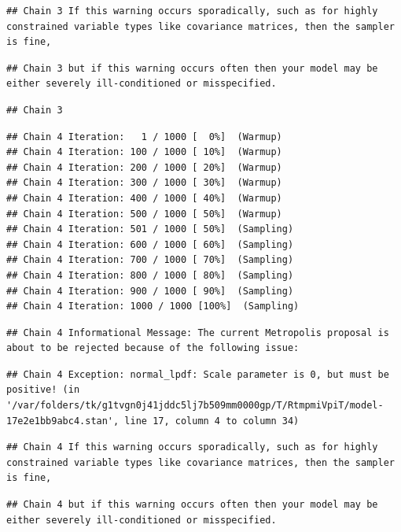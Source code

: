\documentclass[
]{book}
\begin{document}
\begin{verbatim}
## Chain 3 If this warning occurs sporadically, such as for highly constrained variable types like covariance matrices, then the sampler is fine,
\end{verbatim}

\begin{verbatim}
## Chain 3 but if this warning occurs often then your model may be either severely ill-conditioned or misspecified.
\end{verbatim}

\begin{verbatim}
## Chain 3
\end{verbatim}

\begin{verbatim}
## Chain 4 Iteration:   1 / 1000 [  0%]  (Warmup) 
## Chain 4 Iteration: 100 / 1000 [ 10%]  (Warmup) 
## Chain 4 Iteration: 200 / 1000 [ 20%]  (Warmup) 
## Chain 4 Iteration: 300 / 1000 [ 30%]  (Warmup) 
## Chain 4 Iteration: 400 / 1000 [ 40%]  (Warmup) 
## Chain 4 Iteration: 500 / 1000 [ 50%]  (Warmup) 
## Chain 4 Iteration: 501 / 1000 [ 50%]  (Sampling) 
## Chain 4 Iteration: 600 / 1000 [ 60%]  (Sampling) 
## Chain 4 Iteration: 700 / 1000 [ 70%]  (Sampling) 
## Chain 4 Iteration: 800 / 1000 [ 80%]  (Sampling) 
## Chain 4 Iteration: 900 / 1000 [ 90%]  (Sampling) 
## Chain 4 Iteration: 1000 / 1000 [100%]  (Sampling)
\end{verbatim}

\begin{verbatim}
## Chain 4 Informational Message: The current Metropolis proposal is about to be rejected because of the following issue:
\end{verbatim}

\begin{verbatim}
## Chain 4 Exception: normal_lpdf: Scale parameter is 0, but must be positive! (in '/var/folders/tk/g1tvgn0j41jddc5lj7b509mm0000gp/T/RtmpmiVpiT/model-17e2e1bb9abc4.stan', line 17, column 4 to column 34)
\end{verbatim}

\begin{verbatim}
## Chain 4 If this warning occurs sporadically, such as for highly constrained variable types like covariance matrices, then the sampler is fine,
\end{verbatim}

\begin{verbatim}
## Chain 4 but if this warning occurs often then your model may be either severely ill-conditioned or misspecified.
\end{verbatim}
\end{document}
